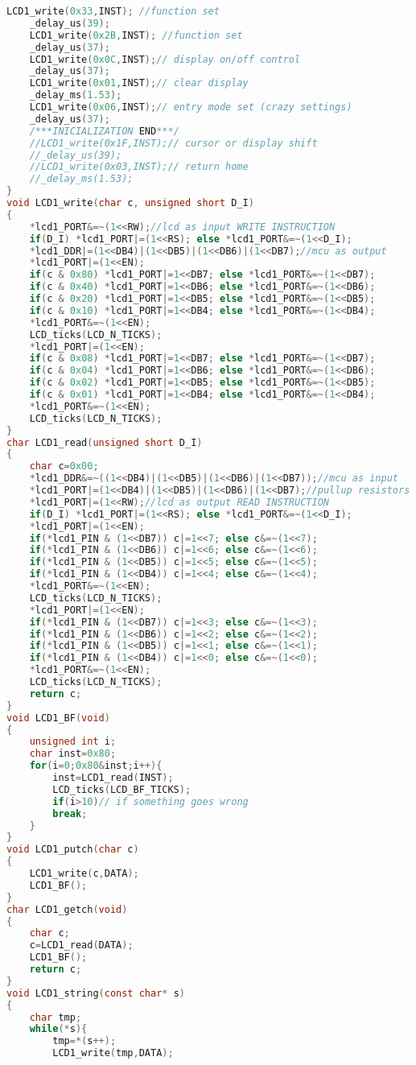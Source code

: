 \begin{lstlisting}[language=C]
	LCD1_write(0x33,INST); //function set
	_delay_us(39);
	LCD1_write(0x2B,INST); //function set
	_delay_us(37);
	LCD1_write(0x0C,INST);// display on/off control
	_delay_us(37);
	LCD1_write(0x01,INST);// clear display
	_delay_ms(1.53);
	LCD1_write(0x06,INST);// entry mode set (crazy settings)
	_delay_us(37);
	/***INICIALIZATION END***/
	//LCD1_write(0x1F,INST);// cursor or display shift
	//_delay_us(39);
	//LCD1_write(0x03,INST);// return home
	//_delay_ms(1.53);
}
void LCD1_write(char c, unsigned short D_I)
{
	*lcd1_PORT&=~(1<<RW);//lcd as input WRITE INSTRUCTION
	if(D_I) *lcd1_PORT|=(1<<RS); else *lcd1_PORT&=~(1<<D_I);
	*lcd1_DDR|=(1<<DB4)|(1<<DB5)|(1<<DB6)|(1<<DB7);//mcu as output
	*lcd1_PORT|=(1<<EN);
	if(c & 0x80) *lcd1_PORT|=1<<DB7; else *lcd1_PORT&=~(1<<DB7);
	if(c & 0x40) *lcd1_PORT|=1<<DB6; else *lcd1_PORT&=~(1<<DB6);
	if(c & 0x20) *lcd1_PORT|=1<<DB5; else *lcd1_PORT&=~(1<<DB5);
	if(c & 0x10) *lcd1_PORT|=1<<DB4; else *lcd1_PORT&=~(1<<DB4);
	*lcd1_PORT&=~(1<<EN);
	LCD_ticks(LCD_N_TICKS);
	*lcd1_PORT|=(1<<EN);
	if(c & 0x08) *lcd1_PORT|=1<<DB7; else *lcd1_PORT&=~(1<<DB7);
	if(c & 0x04) *lcd1_PORT|=1<<DB6; else *lcd1_PORT&=~(1<<DB6);
	if(c & 0x02) *lcd1_PORT|=1<<DB5; else *lcd1_PORT&=~(1<<DB5);
	if(c & 0x01) *lcd1_PORT|=1<<DB4; else *lcd1_PORT&=~(1<<DB4);
	*lcd1_PORT&=~(1<<EN);
	LCD_ticks(LCD_N_TICKS);
}
char LCD1_read(unsigned short D_I)
{
	char c=0x00;
	*lcd1_DDR&=~((1<<DB4)|(1<<DB5)|(1<<DB6)|(1<<DB7));//mcu as input
	*lcd1_PORT|=(1<<DB4)|(1<<DB5)|(1<<DB6)|(1<<DB7);//pullup resistors
	*lcd1_PORT|=(1<<RW);//lcd as output READ INSTRUCTION
	if(D_I) *lcd1_PORT|=(1<<RS); else *lcd1_PORT&=~(1<<D_I);
	*lcd1_PORT|=(1<<EN);
	if(*lcd1_PIN & (1<<DB7)) c|=1<<7; else c&=~(1<<7);
	if(*lcd1_PIN & (1<<DB6)) c|=1<<6; else c&=~(1<<6);
	if(*lcd1_PIN & (1<<DB5)) c|=1<<5; else c&=~(1<<5);
	if(*lcd1_PIN & (1<<DB4)) c|=1<<4; else c&=~(1<<4);
	*lcd1_PORT&=~(1<<EN);
	LCD_ticks(LCD_N_TICKS);
	*lcd1_PORT|=(1<<EN);
	if(*lcd1_PIN & (1<<DB7)) c|=1<<3; else c&=~(1<<3);
	if(*lcd1_PIN & (1<<DB6)) c|=1<<2; else c&=~(1<<2);
	if(*lcd1_PIN & (1<<DB5)) c|=1<<1; else c&=~(1<<1);
	if(*lcd1_PIN & (1<<DB4)) c|=1<<0; else c&=~(1<<0);
	*lcd1_PORT&=~(1<<EN);
	LCD_ticks(LCD_N_TICKS);
	return c;
}
void LCD1_BF(void)
{
	unsigned int i;
	char inst=0x80;
	for(i=0;0x80&inst;i++){
		inst=LCD1_read(INST);
		LCD_ticks(LCD_BF_TICKS);
		if(i>10)// if something goes wrong
		break;
	}
}
void LCD1_putch(char c)
{
	LCD1_write(c,DATA);
	LCD1_BF();
}
char LCD1_getch(void)
{
	char c;
	c=LCD1_read(DATA);
	LCD1_BF();
	return c;
}
void LCD1_string(const char* s)
{
	char tmp;
	while(*s){
		tmp=*(s++);
		LCD1_write(tmp,DATA);

\end{lstlisting}
